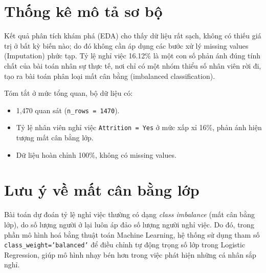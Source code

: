 \section{Thống kê mô tả sơ bộ}
Kết quả phân tích khám phá (EDA) cho thấy dữ liệu rất sạch, không có thiếu giá trị ở bất kỳ biến nào; do đó không cần áp dụng các bước xử lý missing values (Imputation) phức tạp. Tỷ lệ nghỉ việc 16.12\% là một con số phản ánh đúng tính chất của bài toán nhân sự thực tế, nơi chỉ có một nhóm thiểu số nhân viên rời đi, tạo ra bài toán phân loại mất cân bằng (imbalanced classification).

Tóm tắt ở mức tổng quan, bộ dữ liệu có:
\begin{itemize}
  \item 1{,}470 quan sát (\texttt{n\_rows = 1470}).
  \item Tỷ lệ nhân viên nghỉ việc \texttt{Attrition = Yes} ở mức xấp xỉ 16\%, phản ánh hiện tượng mất cân bằng lớp.
  \item Dữ liệu hoàn chỉnh 100\%, không có missing values.
\end{itemize}

\section{Lưu ý về mất cân bằng lớp}
Bài toán dự đoán tỷ lệ nghỉ việc thường có dạng \textit{class imbalance} (mất cân bằng lớp), do số lượng người ở lại luôn áp đảo số lượng người nghỉ việc. Do đó, trong phần mô hình hoá bằng thuật toán Machine Learning, hệ thống sử dụng tham số \texttt{class\_weight='balanced'} để điều chỉnh tự động trọng số lớp trong Logistic Regression, giúp mô hình nhạy bén hơn trong việc phát hiện những cá nhân sắp nghỉ.

